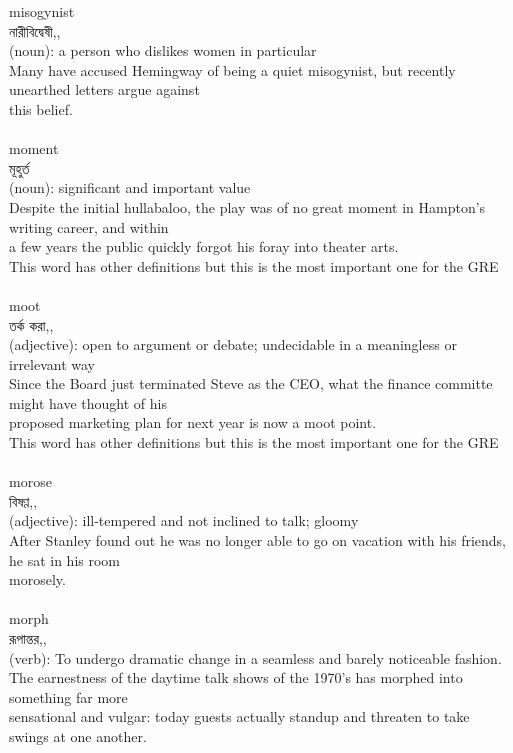 \documentclass{article}
\begin{document}
{misogynist}\\
{নারীবিদ্বেষী,,}\\
{(noun): a person who dislikes women in particular\\Many have accused Hemingway of being a quiet misogynist, but recently unearthed letters argue against\\this belief.\\}\\
{moment}\\
{মূহুর্ত}\\
{(noun): significant and important value\\Despite the initial hullabaloo, the play was of no great moment in Hampton's writing career, and within\\a few years the public quickly forgot his foray into theater arts.\\This word has other definitions but this is the most important one for the GRE\\}\\
{moot}\\
{তর্ক করা,,}\\
{(adjective): open to argument or debate; undecidable in a meaningless or irrelevant way\\Since the Board just terminated Steve as the CEO, what the finance committe might have thought of his\\proposed marketing plan for next year is now a moot point.\\This word has other definitions but this is the most important one for the GRE\\}\\
{morose}\\
{বিষণ্ণ,,}\\
{(adjective): ill-tempered and not inclined to talk; gloomy\\After Stanley found out he was no longer able to go on vacation with his friends, he sat in his room\\morosely.\\}\\
{morph}\\
{রূপান্তর,,}\\
{(verb): To undergo dramatic change in a seamless and barely noticeable fashion.\\The earnestness of the daytime talk shows of the 1970's has morphed into something far more\\sensational and vulgar: today guests actually standup and threaten to take swings at one another.\\}\\
\end{document}
